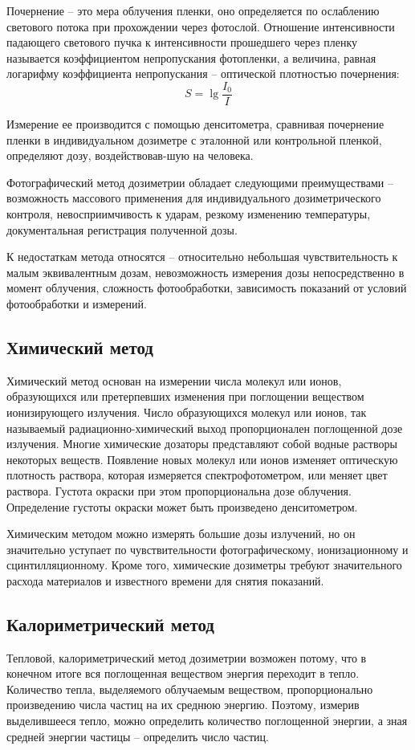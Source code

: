 \documentclass[14pt,pscyr,titlepage]{hedreport}
\begin{document}
		Почернение -- это мера облучения пленки, оно определяется по 
		ослаблению светового потока при прохождении через фотослой. Отношение 
		интенсивности падающего светового пучка к интенсивности прошедшего 
		через пленку называется  коэффициентом непропускания фотопленки, а 
		величина, равная логарифму коэффициента непропускания -- оптической 
		плотностью почернения:
		\[
			S = \lg\frac{I_0}{I}
		\]

		Измерение ее производится с помощью денситометра, сравнивая почернение 
		пленки в индивидуальном дозиметре с эталонной или контрольной 
		пленкой, определяют дозу, воздействовав-шую на человека. 

		Фотографический метод дозиметрии обладает следующими 
		преимуществами -- возможность массового применения для индивидуального 
		дозиметрического контроля, невосприимчивость к ударам, резкому 
		изменению температуры, документальная регистрация полученной дозы.

		К недостаткам метода относятся -- относительно небольшая 
		чувствительность к малым эквивалентным дозам, невозможность измерения 
		дозы непосредственно в момент облучения, сложность фотообработки, 
		зависимость показаний от условий фотообработки и измерений.

	\subsection{Химический метод}
		Химический метод основан на измерении числа молекул или ионов, 
		образующихся или претерпевших изменения при поглощении веществом 
		ионизирующего излучения. Число образующихся молекул или ионов, так
		называемый радиационно-химический выход пропорционален поглощенной 
		дозе излучения. Многие химические дозаторы представляют собой водные 
		растворы некоторых веществ. Появление новых молекул или ионов изменяет 
		оптическую плотность раствора, которая измеряется  спектрофотометром, 
		или меняет цвет раствора. Густота окраски при этом пропорциональна 
		дозе облучения. Определение густоты окраски может быть произведено 
		денситометром.

		Химическим методом можно измерять большие дозы излучений, но он 
		значительно уступает по чувствительности фотографическому, 
		ионизационному и сцинтилляционному. Кроме того, химические дозиметры 
		требуют значительного расхода материалов и известного времени для 
		снятия показаний.

	\subsection{Калориметрический метод}
		Тепловой, калориметрический метод дозиметрии возможен потому, что в 
		конечном итоге вся поглощенная веществом энергия переходит в тепло. 
		Количество тепла, выделяемого облучаемым веществом, пропорционально 
		произведению числа частиц на их среднюю энергию. Поэтому, измерив 
		выделившееся тепло, можно определить количество поглощенной энергии, а 
		зная средней энергии частицы -- определить число частиц.      
\end{document}
